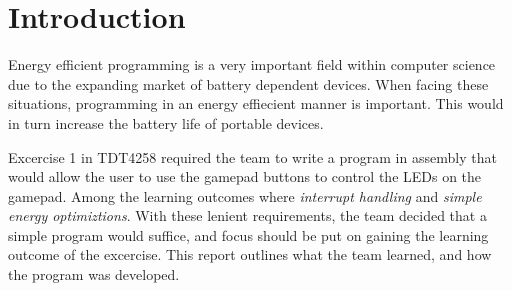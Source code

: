 \section{Introduction}
Energy efficient programming is a very important field within computer science due to the expanding market of battery dependent devices.
When facing these situations, programming in an energy effiecient manner is important.
This would in turn increase the battery life of portable devices.

Excercise 1 in TDT4258 required the team to write a program in assembly that would allow the user to use the gamepad buttons to control the LEDs on the gamepad.
Among the learning outcomes where \emph{interrupt handling} and \emph{simple energy optimiztions}.
With these lenient requirements, the team decided that a simple program would suffice, and focus should be put on gaining the learning outcome of the excercise.
This report outlines what the team learned, and how the program was developed.

